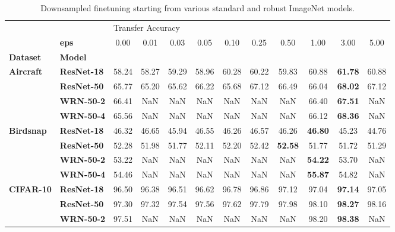 \begin{table}
\centering
\caption{Downsampled finetuning starting from various standard and robust ImageNet models.}
\label{app:downsampling-Finetuning}
\begin{tabular}{l|l|cccccccccc}
\toprule
       & {} & \multicolumn{10}{l}{Transfer Accuracy} \\
       & \textbf{eps} &              0.00 &  0.01 &  0.03 &  0.05 &  0.10 &  0.25 &  0.50 &  1.00 &  3.00 &  5.00 \\
\textbf{Dataset} & \textbf{Model} &                   &       &       &       &       &       &       &       &       &       \\
\midrule
\multirow{4}{*}{\textbf{Aircraft}} & \textbf{ResNet-18} &             58.24 & 58.27 & 59.29 & 58.96 & 60.28 & 60.22 & 59.83 & 60.88 & \textbf{61.78} & 60.88 \\
       & \textbf{ResNet-50} &             65.77 & 65.20 & 65.62 & 66.22 & 65.68 & 67.12 & 66.49 & 66.04 & \textbf{68.02} & 67.12 \\
       & \textbf{WRN-50-2} &             66.41 &   NaN &   NaN &   NaN &   NaN &   NaN &   NaN & 66.40 & \textbf{67.51} &   NaN \\
       & \textbf{WRN-50-4} &             65.56 &   NaN &   NaN &   NaN &   NaN &   NaN &   NaN & 66.12 & \textbf{68.36} &   NaN \\
\cline{1-12}
\multirow{4}{*}{\textbf{Birdsnap}} & \textbf{ResNet-18} &             46.32 & 46.65 & 45.94 & 46.55 & 46.26 & 46.57 & 46.26 & \textbf{46.80} & 45.23 & 44.76 \\
       & \textbf{ResNet-50} &             52.28 & 51.98 & 51.77 & 52.11 & 52.20 & 52.42 & \textbf{52.58} & 51.77 & 51.72 & 51.29 \\
       & \textbf{WRN-50-2} &             53.22 &   NaN &   NaN &   NaN &   NaN &   NaN &   NaN & \textbf{54.22} & 53.70 &   NaN \\
       & \textbf{WRN-50-4} &             54.46 &   NaN &   NaN &   NaN &   NaN &   NaN &   NaN & \textbf{55.87} & 54.82 &   NaN \\
\cline{1-12}
\multirow{4}{*}{\textbf{CIFAR-10}} & \textbf{ResNet-18} &             96.50 & 96.38 & 96.51 & 96.62 & 96.78 & 96.86 & 97.12 & 97.04 & \textbf{97.14} & 97.05 \\
       & \textbf{ResNet-50} &             97.30 & 97.32 & 97.54 & 97.56 & 97.62 & 97.79 & 97.98 & 98.10 & \textbf{98.27} & 98.16 \\
       & \textbf{WRN-50-2} &             97.51 &   NaN &   NaN &   NaN &   NaN &   NaN &   NaN & 98.20 & \textbf{98.38} &   NaN \\

\end{tabular}
\end{table}
